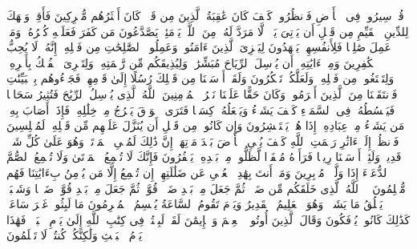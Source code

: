 \startbuffer[\q:30:42]
قُلۡ سِیرُوا۟ فِی ٱلۡأَرۡضِ فَٱنظُرُوا۟ كَیۡفَ كَانَ عَٰقِبَةُ ٱلَّذِینَ مِن قَبۡلُۚ كَانَ أَكۡثَرُهُم مُّشۡرِكِینَ%
\stopbuffer%
\startbuffer[\q:30:43]
فَأَقِمۡ وَجۡهَكَ لِلدِّینِ ٱلۡقَیِّمِ مِن قَبۡلِ أَن یَأۡتِیَ یَوۡمࣱ لَّا مَرَدَّ لَهُۥ مِنَ ٱللَّهِۖ یَوۡمَئِذࣲ یَصَّدَّعُونَ%
\stopbuffer%
\startbuffer[\q:30:44]
مَن كَفَرَ فَعَلَیۡهِ كُفۡرُهُۥۖ وَمَنۡ عَمِلَ صَٰلِحࣰا فَلِأَنفُسِهِمۡ یَمۡهَدُونَ%
\stopbuffer%
\startbuffer[\q:30:45]
لِیَجۡزِیَ ٱلَّذِینَ ءَامَنُوا۟ وَعَمِلُوا۟ ٱلصَّٰلِحَٰتِ مِن فَضۡلِهِۦۤۚ إِنَّهُۥ لَا یُحِبُّ ٱلۡكَٰفِرِینَ%
\stopbuffer%
\startbuffer[\q:30:46]
وَمِنۡ ءَایَٰتِهِۦۤ أَن یُرۡسِلَ ٱلرِّیَاحَ مُبَشِّرَٰتࣲ وَلِیُذِیقَكُم مِّن رَّحۡمَتِهِۦ وَلِتَجۡرِیَ ٱلۡفُلۡكُ بِأَمۡرِهِۦ وَلِتَبۡتَغُوا۟ مِن فَضۡلِهِۦ وَلَعَلَّكُمۡ تَشۡكُرُونَ%
\stopbuffer%
\startbuffer[\q:30:47]
وَلَقَدۡ أَرۡسَلۡنَا مِن قَبۡلِكَ رُسُلًا إِلَىٰ قَوۡمِهِمۡ فَجَاۤءُوهُم بِٱلۡبَیِّنَٰتِ فَٱنتَقَمۡنَا مِنَ ٱلَّذِینَ أَجۡرَمُوا۟ۖ وَكَانَ حَقًّا عَلَیۡنَا نَصۡرُ ٱلۡمُؤۡمِنِینَ%
\stopbuffer%
\startbuffer[\q:30:48]
ٱللَّهُ ٱلَّذِی یُرۡسِلُ ٱلرِّیَٰحَ فَتُثِیرُ سَحَابࣰا فَیَبۡسُطُهُۥ فِی ٱلسَّمَاۤءِ كَیۡفَ یَشَاۤءُ وَیَجۡعَلُهُۥ كِسَفࣰا فَتَرَى ٱلۡوَدۡقَ یَخۡرُجُ مِنۡ خِلَٰلِهِۦۖ فَإِذَاۤ أَصَابَ بِهِۦ مَن یَشَاۤءُ مِنۡ عِبَادِهِۦۤ إِذَا هُمۡ یَسۡتَبۡشِرُونَ%
\stopbuffer%
\startbuffer[\q:30:49]
وَإِن كَانُوا۟ مِن قَبۡلِ أَن یُنَزَّلَ عَلَیۡهِم مِّن قَبۡلِهِۦ لَمُبۡلِسِینَ%
\stopbuffer%
\startbuffer[\q:30:50]
فَٱنظُرۡ إِلَىٰۤ ءَاثَٰرِ رَحۡمَتِ ٱللَّهِ كَیۡفَ یُحۡیِ ٱلۡأَرۡضَ بَعۡدَ مَوۡتِهَاۤۚ إِنَّ ذَٰلِكَ لَمُحۡیِ ٱلۡمَوۡتَىٰۖ وَهُوَ عَلَىٰ كُلِّ شَیۡءࣲ قَدِیرࣱ%
\stopbuffer%
\startbuffer[\q:30:51]
وَلَئِنۡ أَرۡسَلۡنَا رِیحࣰا فَرَأَوۡهُ مُصۡفَرࣰّا لَّظَلُّوا۟ مِنۢ بَعۡدِهِۦ یَكۡفُرُونَ%
\stopbuffer%
\startbuffer[\q:30:52]
فَإِنَّكَ لَا تُسۡمِعُ ٱلۡمَوۡتَىٰ وَلَا تُسۡمِعُ ٱلصُّمَّ ٱلدُّعَاۤءَ إِذَا وَلَّوۡا۟ مُدۡبِرِینَ%
\stopbuffer%
\startbuffer[\q:30:53]
وَمَاۤ أَنتَ بِهَٰدِ ٱلۡعُمۡیِ عَن ضَلَٰلَتِهِمۡۖ إِن تُسۡمِعُ إِلَّا مَن یُؤۡمِنُ بِءَایَٰتِنَا فَهُم مُّسۡلِمُونَ%
\stopbuffer%
\startbuffer[\q:30:54]
۞ ٱللَّهُ ٱلَّذِی خَلَقَكُم مِّن ضَعۡفࣲ ثُمَّ جَعَلَ مِنۢ بَعۡدِ ضَعۡفࣲ قُوَّةࣰ ثُمَّ جَعَلَ مِنۢ بَعۡدِ قُوَّةࣲ ضَعۡفࣰا وَشَیۡبَةࣰۚ یَخۡلُقُ مَا یَشَاۤءُۚ وَهُوَ ٱلۡعَلِیمُ ٱلۡقَدِیرُ%
\stopbuffer%
\startbuffer[\q:30:55]
وَیَوۡمَ تَقُومُ ٱلسَّاعَةُ یُقۡسِمُ ٱلۡمُجۡرِمُونَ مَا لَبِثُوا۟ غَیۡرَ سَاعَةࣲۚ كَذَٰلِكَ كَانُوا۟ یُؤۡفَكُونَ%
\stopbuffer%
\startbuffer[\q:30:56]
وَقَالَ ٱلَّذِینَ أُوتُوا۟ ٱلۡعِلۡمَ وَٱلۡإِیمَٰنَ لَقَدۡ لَبِثۡتُمۡ فِی كِتَٰبِ ٱللَّهِ إِلَىٰ یَوۡمِ ٱلۡبَعۡثِۖ فَهَٰذَا یَوۡمُ ٱلۡبَعۡثِ وَلَٰكِنَّكُمۡ كُنتُمۡ لَا تَعۡلَمُونَ%
